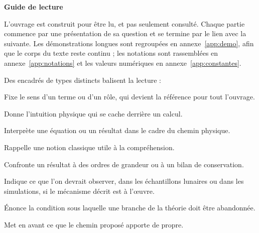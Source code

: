 \documentclass[11pt,a4paper,openany]{report}
\begin{document}
\clearpage
\thispagestyle{plain}
\begin{center}{\Large\bfseries Guide de lecture}\end{center}
\medskip

L'ouvrage est construit pour être lu, et pas seulement consulté. Chaque partie commence par une
présentation de sa question et se termine par le lien avec la suivante. Les démonstrations
longues sont regroupées en annexe~\ref{app:demo}, afin que le corps du texte reste continu ; les
notations sont rassemblées en annexe~\ref{app:notations} et les valeurs numériques en
annexe~\ref{app:constantes}.

Des encadrés de types distincts balisent la lecture :

\begin{definition}
Fixe le sens d'un terme ou d'un rôle, qui devient la référence pour tout l'ouvrage.
\end{definition}
\begin{ideephys}
Donne l'intuition physique qui se cache derrière un calcul.
\end{ideephys}
\begin{lecture}
Interprète une équation ou un résultat dans le cadre du chemin physique.
\end{lecture}
\begin{rappel}
Rappelle une notion classique utile à la compréhension.
\end{rappel}
\begin{controle}
Confronte un résultat à des ordres de grandeur ou à un bilan de conservation.
\end{controle}
\begin{consequence}
Indique ce que l'on devrait observer, dans les échantillons lunaires ou dans les simulations,
si le mécanisme décrit est à l'\oe uvre.
\end{consequence}
\begin{falsif}
Énonce la condition sous laquelle une branche de la théorie doit être abandonnée.
\end{falsif}
\begin{apport}
Met en avant ce que le chemin proposé apporte de propre.
\end{apport}

\clearpage
\tableofcontents

\clearpage
{}
\end{document}
